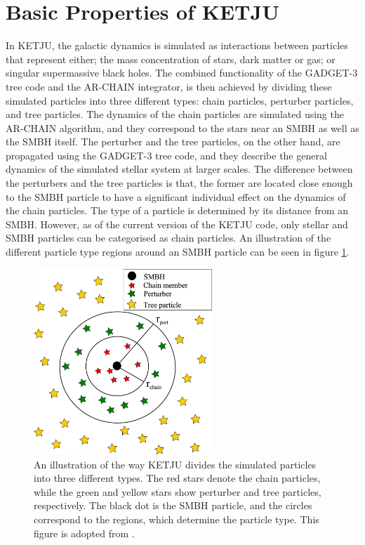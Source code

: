 \documentclass[english, twoside]{HYgradu}
\begin{document}

\section{Basic Properties of KETJU}

In KETJU, the galactic dynamics is simulated as interactions between particles that represent either; the mass concentration of stars, dark matter or gas; or singular supermassive black holes. The combined functionality of the GADGET-3 tree code and the AR-CHAIN integrator, is then achieved by dividing these simulated particles into three different types: chain particles, perturber particles, and tree particles. The dynamics of the chain particles are simulated using the AR-CHAIN algorithm, and they correspond to the stars near an SMBH as well as the SMBH itself. The perturber and the tree particles, on the other hand, are propagated using the GADGET-3 tree code, and they describe the general dynamics of the simulated stellar system at larger scales. The difference between the perturbers and the tree particles is that, the former are located close enough to the SMBH particle to have a significant individual effect on the dynamics of the chain particles. The type of a particle is determined by its distance from an SMBH. However, as of the current version of the KETJU code, only stellar and SMBH particles can be categorised as chain particles. An illustration of the different particle type regions around an SMBH particle can be seen in figure \ref{figure:ketju_regions_illustration}.

\begin{figure}
	\centering	
	\includegraphics[width=0.6\textwidth]{rantala2017.jpg}	
	\caption{An illustration of the way KETJU divides the simulated particles into three different types. The red stars denote the chain particles, while the green and yellow stars show perturber and tree particles, respectively. The black dot is the SMBH particle, and the circles correspond to the regions, which determine the particle type. This figure is adopted from \cite{Rantala2017KETJU}.}
	\label{figure:ketju_regions_illustration}
\end{figure}
\end{document}
